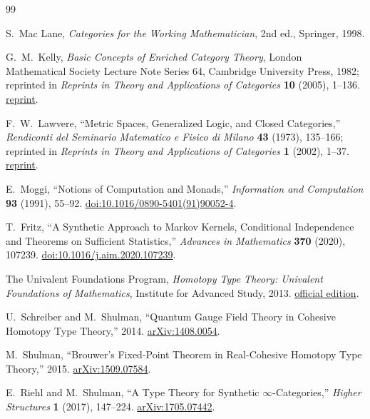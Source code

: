 \documentclass[a4paper,11pt]{ltjsarticle}
\theoremstyle{remark}
\begin{document}
\begin{thebibliography}{99}

S.~Mac Lane,
\textit{Categories for the Working Mathematician}, 2nd ed.,
Springer, 1998.

G.~M.~Kelly,
\textit{Basic Concepts of Enriched Category Theory},
London Mathematical Society Lecture Note Series 64,
Cambridge University Press, 1982;
reprinted in \textit{Reprints in Theory and Applications of Categories}
\textbf{10} (2005), 1--136.
\href{https://www.tac.mta.ca/tac/reprints/articles/10/tr10abs.html}{reprint}.

F.~W.~Lawvere,
``Metric Spaces, Generalized Logic, and Closed Categories,''
\textit{Rendiconti del Seminario Matematico e Fisico di Milano}
\textbf{43} (1973), 135--166;
reprinted in \textit{Reprints in Theory and Applications of Categories}
\textbf{1} (2002), 1--37.
\href{https://www.tac.mta.ca/tac/reprints/articles/1/tr1abs.html}{reprint}.

E.~Moggi,
``Notions of Computation and Monads,''
\textit{Information and Computation} \textbf{93} (1991), 55--92.
\href{https://doi.org/10.1016/0890-5401(91)90052-4}{doi:10.1016/0890-5401(91)90052-4}.

T.~Fritz,
``A Synthetic Approach to Markov Kernels, Conditional Independence and Theorems on Sufficient Statistics,''
\textit{Advances in Mathematics} \textbf{370} (2020), 107239.
\href{https://doi.org/10.1016/j.aim.2020.107239}{doi:10.1016/j.aim.2020.107239}.

The Univalent Foundations Program,
\textit{Homotopy Type Theory: Univalent Foundations of Mathematics},
Institute for Advanced Study, 2013.
\href{https://homotopytypetheory.org/book/}{official edition}.

U.~Schreiber and M.~Shulman,
``Quantum Gauge Field Theory in Cohesive Homotopy Type Theory,''
2014.
\href{https://arxiv.org/abs/1408.0054}{arXiv:1408.0054}.

M.~Shulman,
``Brouwer's Fixed-Point Theorem in Real-Cohesive Homotopy Type Theory,''
2015.
\href{https://arxiv.org/abs/1509.07584}{arXiv:1509.07584}.

E.~Riehl and M.~Shulman,
``A Type Theory for Synthetic $\infty$-Categories,''
\textit{Higher Structures} \textbf{1} (2017), 147--224.
\href{https://arxiv.org/abs/1705.07442}{arXiv:1705.07442}.


\end{thebibliography}
\end{document}

